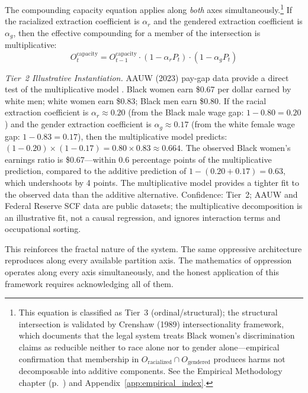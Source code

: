 The compounding capacity equation applies along \textit{both} axes simultaneously.\footnote{This equation is classified as Tier~3 (ordinal/structural); the structural intersection is validated by Crenshaw (1989) intersectionality framework, which documents that the legal system treats Black women's discrimination claims as reducible neither to race alone nor to gender alone---empirical confirmation that membership in $O_{\text{racialized}} \cap O_{\text{gendered}}$ produces harms not decomposable into additive components. See the Empirical Methodology chapter (p.~\pageref{ch:empirical_methodology}) and Appendix~\ref{app:empirical_index}.} If the racialized extraction coefficient is $\alpha_r$ and the gendered extraction coefficient is $\alpha_g$, then the effective compounding for a member of the intersection is multiplicative:
\begin{equation}\label{eq:12.9-multiplicative-intersection-compounding}
O_t^{\text{capacity}} = O_{t-1}^{\text{capacity}} \cdot (1 - \alpha_r P_t) \cdot (1 - \alpha_g P_t)
\end{equation}

\noindent\textit{Tier~2 Illustrative Instantiation.} AAUW (2023) pay-gap data provide a direct test of the multiplicative model \cite{aauw_pay_gap}. Black women earn \$0.67 per dollar earned by white men; white women earn \$0.83; Black men earn \$0.80. If the racial extraction coefficient is $\alpha_r \approx 0.20$ (from the Black male wage gap: $1 - 0.80 = 0.20$) and the gender extraction coefficient is $\alpha_g \approx 0.17$ (from the white female wage gap: $1 - 0.83 = 0.17$), then the multiplicative model predicts: $(1 - 0.20) \times (1 - 0.17) = 0.80 \times 0.83 \approx 0.664$. The observed Black women's earnings ratio is \$0.67---within 0.6 percentage points of the multiplicative prediction, compared to the additive prediction of $1 - (0.20 + 0.17) = 0.63$, which undershoots by 4 points. The multiplicative model provides a tighter fit to the observed data than the additive alternative. Confidence: Tier~2; AAUW and Federal Reserve SCF data are public datasets; the multiplicative decomposition is an illustrative fit, not a causal regression, and ignores interaction terms and occupational sorting.

This reinforces the fractal nature of the system. The same oppressive architecture reproduces along every available partition axis. The mathematics of oppression operates along every axis simultaneously, and the honest application of this framework requires acknowledging all of them.

